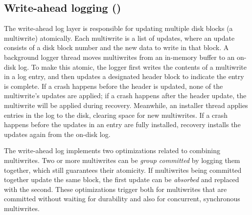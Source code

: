 


\subsection[Write-ahead logging (WAL)]{Write-ahead logging ()}

The write-ahead log layer is responsible for updating multiple disk
blocks (a multiwrite) atomically.
Each multiwrite is a list
of updates, where an update consists of a disk block number and the new data to write in that block.
A background logger thread moves multiwrites from an in-memory buffer to an
on-disk log. To make this atomic, the logger first writes
the contents of a multiwrite in a log entry, and then updates a designated header block to indicate
the entry is complete. If a crash
happens before the header is updated, none of the multiwrite's updates
are applied; if a crash happens after the header update, the multiwrite
will be applied during recovery.
Meanwhile, an installer thread applies entries in the log to the disk, clearing
space for new multiwrites.
If a crash happens before the updates in an entry are fully installed,
recovery installs the updates again from the on-disk log.

The write-ahead log implements two optimizations related to combining
multiwrites. Two or more multiwrites can be \emph{group committed} by logging
them together, which still guarantees their atomicity. If multiwrites being
committed together update the same block, the first update can be
\emph{absorbed} and replaced with the second. These optimizations trigger both
for multiwrites that are committed without waiting for durability and also for
concurrent, synchronous multiwrites.

%

